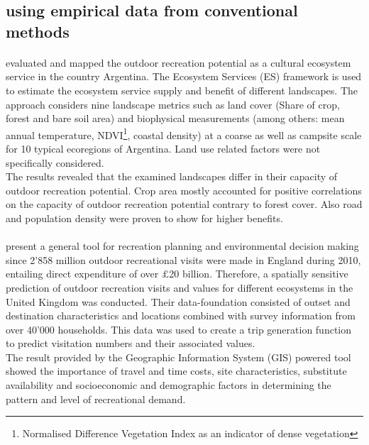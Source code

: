 \subsection{using empirical data from conventional methods}

\paragraph*{\textcite{Weyland2014}} evaluated and mapped the outdoor recreation potential as a cultural ecosystem service in the country Argentina. The Ecosystem Services (ES) framework is used to estimate the ecosystem service supply and benefit of different landscapes. The approach considers nine landscape metrics such as land cover (Share of crop, forest and bare soil area) and biophysical measurements (among others: mean annual temperature, NDVI\footnote{Normalised Difference Vegetation Index as an indicator of dense vegetation}, coastal density) at a coarse as well as campsite scale for 10 typical ecoregions of Argentina. Land use related factors were not specifically considered. \\
The results revealed that the examined landscapes differ in their capacity of outdoor recreation potential. Crop area mostly accounted for positive correlations on the capacity of outdoor recreation potential contrary to forest cover. Also road and population density were proven to show for higher benefits.

\paragraph*{\textcite{Sen2014}} present a general tool for recreation planning and environmental decision making since 2'858 million outdoor recreational visits were made in England during 2010, entailing direct expenditure of over $£$20 billion. Therefore, a spatially sensitive prediction of outdoor recreation visits and values for different ecosystems in the United Kingdom was conducted. Their data-foundation consisted of outset and destination characteristics and locations combined with survey information from over 40'000 households. This data was used to create a trip generation function to predict visitation numbers and their associated values.\\
The result provided by the Geographic Information System (GIS) powered tool showed the importance of travel and time costs, site characteristics, substitute availability and socioeconomic and demographic factors in determining the pattern and level of recreational demand.

